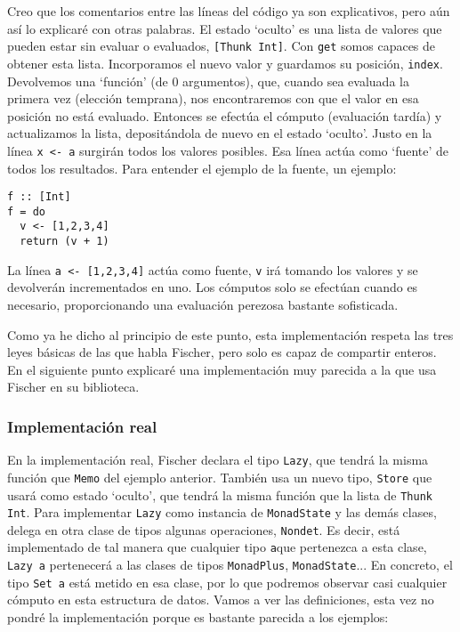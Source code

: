\documentclass[class=article, crop=false]{standalone}
\begin{document}
Creo que los comentarios entre las líneas del código ya son explicativos, pero aún así lo
explicaré con otras palabras. El estado `oculto' es una lista de valores que pueden estar sin
evaluar o evaluados, \verb`[Thunk Int]`. Con \verb`get` somos capaces de obtener esta lista.
Incorporamos el nuevo valor y guardamos su posición, \verb`index`. Devolvemos una `función'
(de 0 argumentos), que, cuando sea evaluada la primera vez (elección temprana), nos
encontraremos con que el valor en esa posición no está evaluado. Entonces se efectúa el
cómputo (evaluación tardía) y actualizamos la lista, depositándola de nuevo en el estado
`oculto'. Justo en la línea \verb`x <- a` surgirán todos los valores posibles. Esa línea
actúa como `fuente' de todos los resultados. Para entender el ejemplo de la fuente, un
ejemplo:
\begin{verbatim}
f :: [Int]
f = do
  v <- [1,2,3,4]
  return (v + 1)
\end{verbatim}

La línea \verb`a <- [1,2,3,4]` actúa como fuente, \verb`v` irá tomando los valores y se
devolverán incrementados en uno. Los cómputos solo se efectúan cuando es necesario,
proporcionando una evaluación perezosa bastante sofisticada.

Como ya he dicho al principio de este punto, esta implementación respeta las tres leyes
básicas de las que habla Fischer, pero solo es capaz de compartir enteros. En el siguiente
punto explicaré una implementación muy parecida a la que usa Fischer en su biblioteca.

\subsubsection{Implementación real}
En la implementación real, Fischer declara el tipo \verb`Lazy`, que tendrá la misma función
que \verb`Memo` del ejemplo anterior. También usa un nuevo tipo, \verb`Store` que usará como
estado `oculto', que tendrá la misma función que la lista de \verb`Thunk Int`. Para
implementar \verb`Lazy` como instancia de \verb`MonadState` y las demás clases, delega en
otra clase de tipos algunas operaciones, \verb`Nondet`. Es decir, está implementado de tal
manera que cualquier tipo \verb`a`que pertenezca a esta clase, \verb`Lazy a` pertenecerá a
las clases de tipos \verb`MonadPlus`, \verb`MonadState`... En concreto, el tipo \verb`Set a`
está metido en esa clase, por lo que podremos observar casi cualquier cómputo en esta
estructura de datos. Vamos a ver las definiciones, esta vez no pondré la implementación
porque es bastante parecida a los ejemplos:
\end{document}
